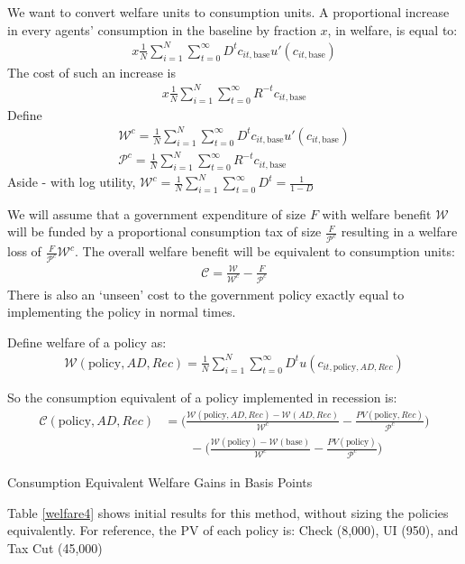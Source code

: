 \documentclass[11pt]{article}
\begin{document}
We want to convert welfare units to consumption units. A proportional increase in every agents' consumption in the baseline by fraction $x$, in welfare, is equal to:
	\begin{align}
	 x\frac{1}{N}\sum_{i=1}^{N} \sum_{t=0}^{\infty} D^t c_{it,\text{base}} u'(c_{it,\text{base}})
	\end{align}
The cost of such an increase is
	\begin{align}
		x\frac{1}{N}\sum_{i=1}^{N} \sum_{t=0}^{\infty} R^{-t} c_{it,\text{base}}
	\end{align}
Define
	\begin{align}
	\mathcal{W}^c =\frac{1}{N}\sum_{i=1}^{N} \sum_{t=0}^{\infty} D^t c_{it,\text{base}} u'(c_{it,\text{base}}) \\
	\mathcal{P}^c = \frac{1}{N}\sum_{i=1}^{N} \sum_{t=0}^{\infty} R^{-t} c_{it,\text{base}}
\end{align}
Aside - with log utility, $\mathcal{W}^c =\frac{1}{N}\sum_{i=1}^{N} \sum_{t=0}^{\infty} D^t = \frac{1}{1-D}$

We will assume that a government expenditure of size $F$ with welfare benefit $\mathcal{W}$ will be funded by a proportional consumption tax of size $\frac{F}{\mathcal{P}^c}$ resulting in a welfare loss of $\frac{F}{\mathcal{P}^c}\mathcal{W}^c$. The overall welfare benefit will be equivalent to consumption units:
	\begin{align}
	\mathcal{C} = \frac{\mathcal{W}}{\mathcal{W}^c} - \frac{F}{\mathcal{P}^c}
	\end{align}
There is also an `unseen' cost to the government policy exactly equal to implementing the policy in normal times.

Define welfare of a policy as:
	\begin{align}
	\mathcal{W}(\text{policy},AD,Rec) = \frac{1}{N}\sum_{i=1}^{N} \sum_{t=0}^{\infty} D^t u(c_{it,\text{policy},AD,Rec})
\end{align}

So the consumption equivalent of a policy implemented in recession is:
	\begin{align}
	\mathcal{C}(\text{policy},AD,Rec) &= \bigg(\frac{\mathcal{W}(\text{policy},AD,Rec)-\mathcal{W}(AD,Rec)}{\mathcal{W}^c} - \frac{PV(\text{policy},Rec)}{\mathcal{P}^c} \bigg)\\ \nonumber
	& \qquad -
	\bigg(\frac{\mathcal{W}(\text{policy}) - \mathcal{W}(\text{base})}{\mathcal{W}^c} - \frac{PV(\text{policy})}{\mathcal{P}^c} \bigg)
	\end{align}

	\begin{table} 
	\center
	
	\caption{Consumption Equivalent Welfare Gains in Basis Points }
	\label{welfare4}
\end{table}

Table \ref{welfare4} shows initial results for this method, without sizing the policies equivalently. For reference, the PV of each policy is: Check (8,000), UI (950), and Tax Cut (45,000)
	
\end{document}
